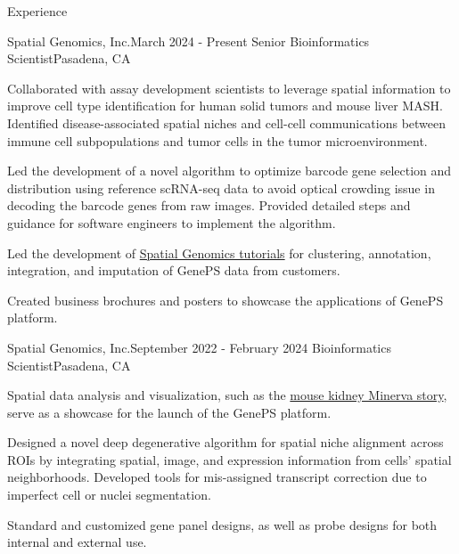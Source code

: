 \documentclass{resume} %
\begin{document}

\begin{rSection}{Experience}
\begin{rSubsection}{Spatial Genomics, Inc.}{March 2024 - Present}
{Senior Bioinformatics Scientist}{Pasadena, CA}
\item Collaborated with assay development scientists to leverage spatial information to improve cell type identification for human solid tumors and mouse liver MASH. Identified disease-associated spatial niches and cell-cell communications between immune cell subpopulations and tumor cells in the tumor microenvironment.

\item Led the development of a novel algorithm to optimize barcode gene selection and distribution using reference scRNA-seq data to avoid optical crowding issue in decoding the barcode genes from raw images. Provided detailed steps and guidance for software engineers to implement the algorithm.

\item Led the development of \href{https://tutorials.spatialgenomics.com/intro.html}{Spatial Genomics tutorials} for clustering, annotation, integration, and imputation of GenePS data from customers.

\item Created business brochures and posters to showcase the applications of GenePS platform.
\end{rSubsection}

\begin{rSubsection}{Spatial Genomics, Inc.}{September 2022 - February 2024}
{Bioinformatics Scientist}{Pasadena, CA}
\item Spatial data analysis and visualization, such as the \href{http://kidneyviewer.spatialgenomics.com/}{mouse kidney Minerva story}, serve as a showcase for the launch of the GenePS platform. 

\item Designed a novel deep degenerative algorithm for spatial niche alignment across ROIs by integrating spatial, image, and expression information from cells' spatial neighborhoods. Developed tools for mis-assigned transcript correction due to imperfect cell or nuclei segmentation.

\item Standard and customized gene panel designs, as well as probe designs for both internal and external use.


\end{rSubsection}
\end{rSection}
\end{document}
